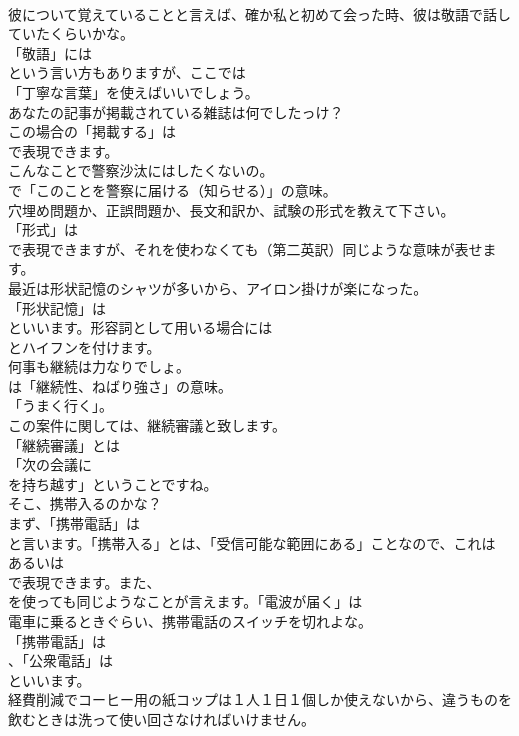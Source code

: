 \documentclass[8pt]{extreport}
\begin{document}
\begin{CJK}{UTF8}{min}
\\	彼について覚えていることと言えば、確か私と初めて会った時、彼は敬語で話していたくらいかな。 
\\	「敬語」には
\\	という言い方もありますが、ここでは
\\	「丁寧な言葉」を使えばいいでしょう。	
\\	あなたの記事が掲載されている雑誌は何でしたっけ？ 
\\	この場合の「掲載する」は
\\	で表現できます。	
\\	こんなことで警察沙汰にはしたくないの。 
\\	で「このことを警察に届ける（知らせる）」の意味。	
\\	穴埋め問題か、正誤問題か、長文和訳か、試験の形式を教えて下さい。 
\\	「形式」は
\\	で表現できますが、それを使わなくても（第二英訳）同じような意味が表せます。	
\\	最近は形状記憶のシャツが多いから、アイロン掛けが楽になった。 
\\	「形状記憶」は
\\	といいます。形容詞として用いる場合には
\\	とハイフンを付けます。	
\\	何事も継続は力なりでしょ。 
\\	は「継続性、ねばり強さ」の意味。
\\	「うまく行く」。	
\\	この案件に関しては、継続審議と致します。 
\\	「継続審議」とは
\\	「次の会議に 
\\	を持ち越す」ということですね。	
\\	そこ、携帯入るのかな？ 
\\	まず、「携帯電話」は
\\	と言います。「携帯入る」とは、「受信可能な範囲にある」ことなので、これは
\\	あるいは
\\	で表現できます。また、
\\	を使っても同じようなことが言えます。「電波が届く」は	
\\	電車に乗るときぐらい、携帯電話のスイッチを切れよな。 
\\	「携帯電話」は 
\\	、「公衆電話」は 
\\	といいます。	
\\	経費削減でコーヒー用の紙コップは１人１日１個しか使えないから、違うものを飲むときは洗って使い回さなければいけません。 

\end{CJK}
\end{document}
